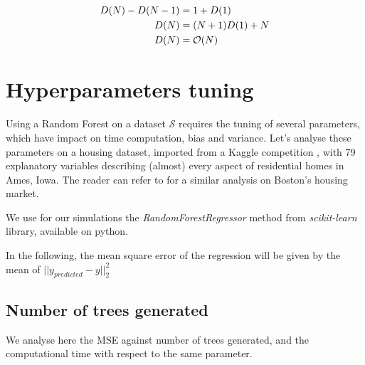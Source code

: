 \documentclass[english,11pt,openany]{report}
\theoremstyle{definition}
\newcommand{\bigO}{\mathcal{O}}
\theoremstyle{plain}
\theoremstyle{definition}
\begin{document}
\begin{appendices}
\begin{itemize}
	\begin{align}
	D(N) - D(N-1) & = 1 + D(1) \notag \\
	D(N) &= (N + 1)D(1) + N \notag \\
	D(N) & = \bigO(N) \notag 
	\end{align}
	 
\end{itemize}


\section{Hyperparameters tuning}

Using a Random Forest on a dataset $\mathcal{S}$ requires the tuning of several parameters, which have impact on time computation, bias and variance. 
Let's analyse these parameters on a housing dataset, imported from a Kaggle competition \cite{kaggle:housing}, with 79 explanatory variables describing (almost) every aspect of residential homes in Ames, Iowa. The reader can refer to \cite{Friedman:2008} for a similar analysis on Boston's housing market. 

We use for our simulations the \textit{RandomForestRegressor} method from \textit{scikit-learn} library, available on python. 

In the following, the mean square error of the regression will be given by the mean of  $||y_{predicted} - y||_2^2$



\subsection{Number of trees generated}

We analyse here  the MSE against number of trees generated, and the computational time with respect to the same parameter.

\begin{figure}[H]
	\centering
	

\end{figure}
\end{appendices}
\end{document}
